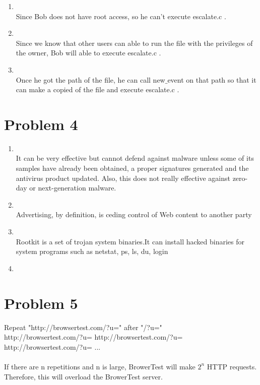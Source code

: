 \documentclass[11pt]{article}
\newenvironment{qparts}{\begin{enumerate}[{(}a{)}]}{\end{enumerate}}
\begin{document}
\begin{qparts}
\item
{}
\\
Since Bob does not have root access, so he can't execute escalate.c .

\item
{}
\\
Since we know that other users can able to run the file with the privileges of the owner, Bob will able to execute escalate.c .

\item
{}
\\
Once he got the path of the file, he can call new$\_$event on that path so  that it can make a copied of the file and execute escalate.c .

\end{qparts}


\newpage
\section*{Problem 4}

\begin{qparts}
\item
{}
\\
It can be very effective but cannot defend against malware unless some of its samples have already been obtained, a proper signatures generated and the antivirus product updated.
Also, this does not really effective against zero-day or next-generation malware.
\item
{}
\\
Advertising, by definition, is ceding control of Web content to another party

\item
{}
\\
Rootkit is a set of trojan system binaries.It can install hacked binaries for system programs such as netstat, ps, ls, du, login

\item
{}


\end{qparts}

\newpage
\section*{Problem 5}

Repeat "http://browsertest.com/?u=" after "/?u="\\
http://browsertest.com/?u= http://browsertest.com/?u= http://browsertest.com/?u= ... \\
\\
If there are n repetitions and n is large, BrowerTest will make $2^n$ HTTP requests. Therefore, this will overload the BrowerTest server.
\end{document}

